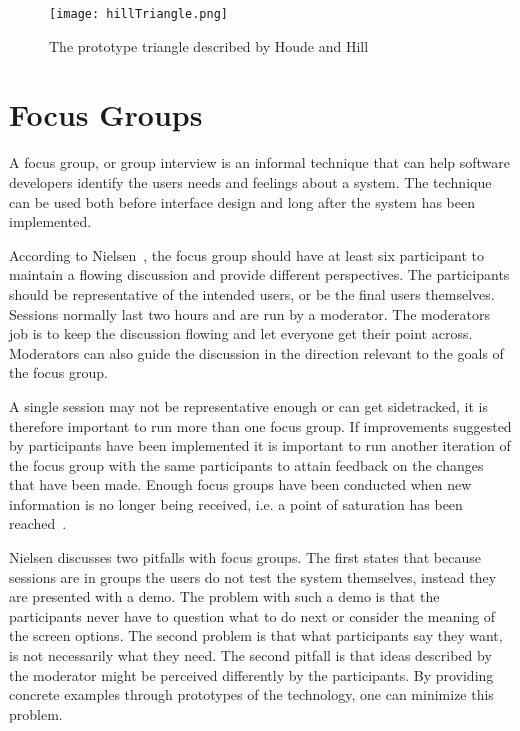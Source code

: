 \begin{figure}[h!]
	\centering
		\texttt{[image: hillTriangle.png]}
		\caption[Prototype triangle]{The prototype triangle described by Houde and Hill~\cite{prototypesPrototype}}
		\label{fig:hillTriangle}
\end{figure}

\section{Focus Groups}
\label{sec:focusGroup}
A focus group, or group interview is an informal technique that can help software developers identify the users needs and feelings about a system. The technique can be used both before interface design and long after the system has been implemented. 

According to Nielsen~\cite{focusGroup}, the focus group should have at least six participant to maintain a flowing discussion and provide different perspectives. The participants should be representative of the intended users, or be the final users themselves. Sessions normally last two hours and are run by a moderator. The moderators job is to keep the discussion flowing and let everyone get their point across. Moderators can also guide the discussion in the direction relevant to the goals of the focus group. 

A single session may not be representative enough or can get sidetracked, it is therefore important to run more than one focus group. If improvements suggested by participants have been implemented it is important to run another iteration of the focus group with the same participants to attain feedback on the changes that have been made. Enough focus groups have been conducted when new information is no longer being received, i.e. a point of saturation has been reached~\cite{howFocusGroup}. 

Nielsen discusses two pitfalls with focus groups. The first states that because sessions are in groups the users do not test the system themselves, instead they are presented with a demo. The problem with such a demo is that the participants never have to question what to do next or consider the meaning of the screen options. The second problem is that what participants say they want, is not necessarily what they need. The second pitfall is that ideas described by the moderator might be perceived differently by the participants. By providing concrete examples through prototypes of the technology, one can minimize this problem.

